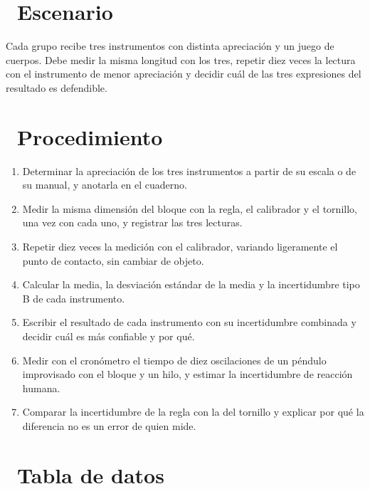 \documentclass[11pt,a4paper]{article}
\newcommand{\iconotexto}[2]{\textcolor{cyanNeon}{\faIcon{#1}}~#2}
\begin{document}
\section{\iconotexto{flask}{Escenario}}

Cada grupo recibe tres instrumentos con distinta apreciación y un juego de cuerpos. Debe medir la misma longitud con los tres, repetir diez veces la lectura con el instrumento de menor apreciación y decidir cuál de las tres expresiones del resultado es defendible.

\section{\iconotexto{list-ol}{Procedimiento}}

\begin{enumerate}[leftmargin=1.4em,itemsep=2pt,topsep=3pt]
  \item Determinar la apreciación de los tres instrumentos a partir de su escala o de su manual, y anotarla en el cuaderno.
  \item Medir la misma dimensión del bloque con la regla, el calibrador y el tornillo, una vez con cada uno, y registrar las tres lecturas.
  \item Repetir diez veces la medición con el calibrador, variando ligeramente el punto de contacto, sin cambiar de objeto.
  \item Calcular la media, la desviación estándar de la media y la incertidumbre tipo B de cada instrumento.
  \item Escribir el resultado de cada instrumento con su incertidumbre combinada y decidir cuál es más confiable y por qué.
  \item Medir con el cronómetro el tiempo de diez oscilaciones de un péndulo improvisado con el bloque y un hilo, y estimar la incertidumbre de reacción humana.
  \item Comparar la incertidumbre de la regla con la del tornillo y explicar por qué la diferencia no es un error de quien mide.
\end{enumerate}

\section{\iconotexto{table}{Tabla de datos}}
\end{document}
